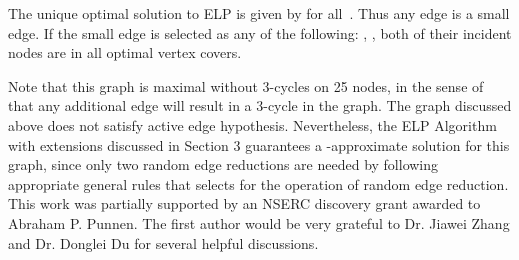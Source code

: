 \documentclass[12pt]{article}
\begin{document}
The unique optimal solution  to ELP is given by
 for all~. Thus any edge is a small edge. If
the small edge is selected as any of the following: , , both of
their incident nodes are in all optimal vertex covers.

\vskip 5pt

Note that this graph is maximal without 3-cycles on 25
nodes, in the sense of that any additional edge will result in a
3-cycle in the graph. The graph discussed above does not satisfy
active edge hypothesis. Nevertheless,   the ELP Algorithm with
extensions discussed in Section 3 guarantees a -approximate
solution for this graph, since only two random edge reductions are
 needed by following appropriate general rules that selects
  for the operation of random edge reduction. \\





 This work was partially
supported by an NSERC discovery grant awarded to Abraham P. Punnen.
The first author would be very grateful to Dr. Jiawei Zhang and Dr.
Donglei Du for several helpful discussions.
\end{document}
